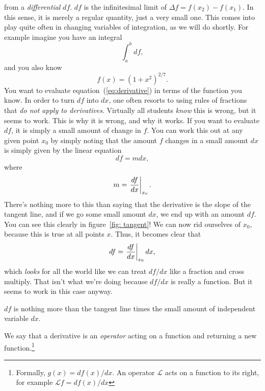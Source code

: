 from a \emph{differential} $df$.
$df$ is the infinitesimal limit of $\Delta f = f(x_2) - f(x_1)$.
In this sense, it is merely a regular quantity, just a very small one.
This comes into play quite often in changing variables of integration, as we will do shortly.
For example imagine you have an integral
\begin{equation}
  \label{eq:test_integral}
  \int_a^b df,
\end{equation}
and you also know
\begin{equation}
  \label{eq:func_test}
  f(x) = (1 + x^2)^{2/7}.
\end{equation}
You want to evaluate equation~(\ref{eq:derivative}) in terms of the function you know.
In order to turn $df$ into $dx$, one often resorts to using rules of fractions that \emph{do not apply to derivatives}.
Virtually all students \emph{know} this is wrong, but it seems to work.
This is why it is wrong, and why it works.
If you want to evaluate $df$, it is simply a small amount of change in $f$.
You can work this out at any given point $x_0$ by simply noting that the amount $f$ changes in a small amount $dx$ is simply given by the linear equation
\begin{equation}
  \label{eq:differential}
  df = m dx,
\end{equation}
where 
\begin{equation}
  \label{eq:m}
  m = \eval{\frac{df}{dx}}_{x_0}.
\end{equation}
There's nothing more to this than saying that the derivative is the slope of the tangent line, and if we go some small amount $dx$, we end up with an amount $df$.
You can see this clearly in figure~\ref{fig: tangent}!
We can now rid ourselves of $x_0$, because this is true at all points $x$.
Thus, it becomes clear that 
\begin{equation}
  \label{eq:m}
  df = \eval{\frac{df}{dx}}_{x_0} dx,
\end{equation}
which \emph{looks} for all the world like we can treat $df/dx$ like a fraction and cross multiply.
That isn't what we're doing because $df/dx$ is really a function.
But it seems to work in this case anyway.

\begin{marginfigure}
\label{fig: tangent}
  \caption{$df$ is nothing more than the tangent line times the small amount of independent variable $dx$.}
\end{marginfigure}
We say that a derivative is an \emph{operator} acting on a function and returning a new function.\footnote{Formally, $g(x) = df(x)/dx$.
An operator $\mathcal{L}$ acts on a function to its right, for example $\mathcal{L} f = df(x)/dx$}

